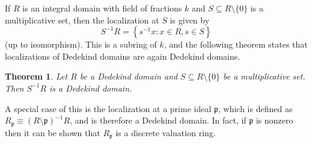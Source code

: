 \documentclass[12pt]{article}
\newtheorem*{theorem*}{Theorem}
\begin{document}
If $R$ is an integral domain with field of fractions $k$ and $S\subseteq R\setminus\{0\}$ is a multiplicative set, then the localization at $S$ is given by
\begin{equation*}
S^{-1}R=\left\{s^{-1}x:x\in R,s\in S\right\}
\end{equation*}
(up to isomorphism). This is a subring of $k$, and the following theorem states that localizations of Dedekind domains are again Dedekind domains.

\begin{theorem*}
Let $R$ be a Dedekind domain and $S\subseteq R\setminus\{0\}$ be a multiplicative set. Then $S^{-1}R$ is a Dedekind domain.
\end{theorem*}

A special case of this is the localization at a prime ideal $\mathfrak{p}$, which is defined as $R_\mathfrak{p}\equiv (R\setminus\mathfrak{p})^{-1}R$, and is therefore a Dedekind domain. In fact, if $\mathfrak{p}$ is nonzero then it can be shown that $R_\mathfrak{p}$ is a discrete valuation ring.

\end{document}
